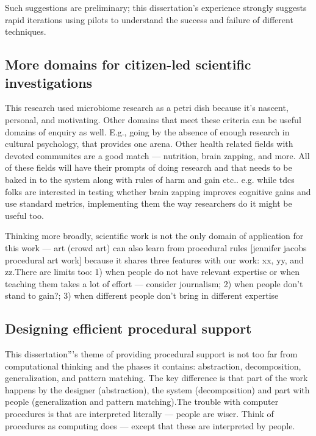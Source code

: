 Such suggestions are preliminary; this dissertation's experience strongly suggests rapid iterations using pilots to understand the success and failure of different techniques. 

\subsection{More domains for citizen-led scientific investigations}
This research used microbiome research as a petri dish because it’s nascent, personal, and motivating. Other domains that meet these criteria can be useful domains of enquiry as well. E.g., going by the absence of enough research in cultural psychology, that provides one arena. Other health related fields with devoted communites are a good match — nutrition, brain zapping, and more. All of these fields will have their prompts of doing research and that needs to be baked in to the system along with rules of harm and gain etc..  e.g. while tdcs folks are interested in testing whether brain zapping improves cognitive gains and use standard metrics, implementing them the way researchers do it might be useful too.

Thinking more broadly, scientific work is not the only domain of application for this work — art (crowd art) can also learn from procedural rules [jennifer jacobs procedural art work] because it shares three features with our work: xx, yy, and zz.There are limits too: 1) when people do not have relevant expertise or when teaching them takes a lot of effort — consider journalism; 2)  when people don’t stand to gain?; 3)  when different people don’t bring in different expertise

\subsection{Designing efficient procedural support}

This dissertation'''s theme of providing procedural support is not too far from computational thinking and the phases it contains: abstraction, decomposition, generalization, and pattern matching. The key difference is that part of the work happens  by the designer (abstraction), the system (decomposition) and part with people (generalization and pattern matching).The trouble with computer procedures is that are interpreted literally — people are wiser. Think of procedures as computing does — except that these are interpreted by people.

